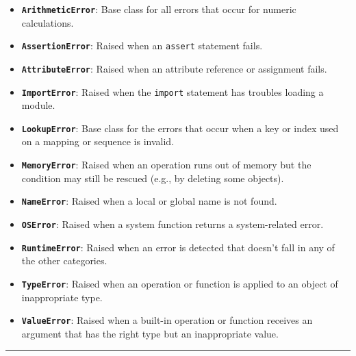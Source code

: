 \begin{itemize}
\tightlist
\item
  \textbf{\passthrough{\lstinline!ArithmeticError!}}: Base class for all
  errors that occur for numeric calculations.
\item
  \textbf{\passthrough{\lstinline!AssertionError!}}: Raised when an
  \passthrough{\lstinline!assert!} statement fails.
\item
  \textbf{\passthrough{\lstinline!AttributeError!}}: Raised when an
  attribute reference or assignment fails.
\item
  \textbf{\passthrough{\lstinline!ImportError!}}: Raised when the
  \passthrough{\lstinline!import!} statement has troubles loading a
  module.
\item
  \textbf{\passthrough{\lstinline!LookupError!}}: Base class for the
  errors that occur when a key or index used on a mapping or sequence is
  invalid.
\item
  \textbf{\passthrough{\lstinline!MemoryError!}}: Raised when an
  operation runs out of memory but the condition may still be rescued
  (e.g., by deleting some objects).
\item
  \textbf{\passthrough{\lstinline!NameError!}}: Raised when a local or
  global name is not found.
\item
  \textbf{\passthrough{\lstinline!OSError!}}: Raised when a system
  function returns a system-related error.
\item
  \textbf{\passthrough{\lstinline!RuntimeError!}}: Raised when an error
  is detected that doesn't fall in any of the other categories.
\item
  \textbf{\passthrough{\lstinline!TypeError!}}: Raised when an operation
  or function is applied to an object of inappropriate type.
\item
  \textbf{\passthrough{\lstinline!ValueError!}}: Raised when a built-in
  operation or function receives an argument that has the right type but
  an inappropriate value.
\end{itemize}

\begin{center}\rule{0.5\linewidth}{0.5pt}\end{center}
